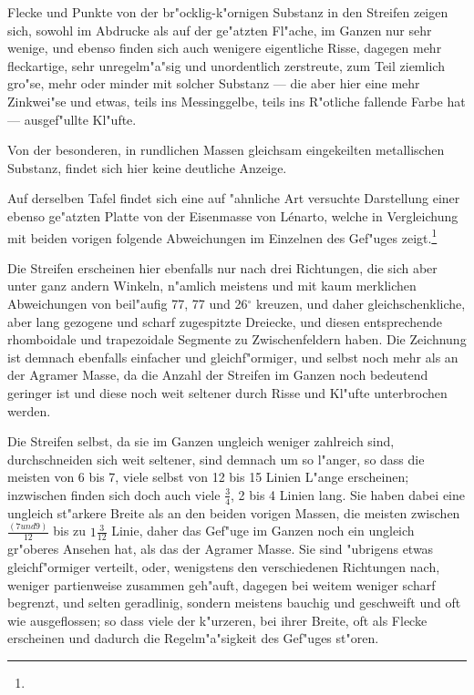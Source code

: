 \documentclass[a4paper, 11pt, oneside, german]{article}
\begin{document}
Flecke und Punkte von der br"ocklig-k"ornigen Substanz in den Streifen zeigen sich, sowohl im Abdrucke als auf der ge"atzten Fl"ache, im Ganzen nur sehr wenige, und ebenso finden sich auch wenigere eigentliche Risse, dagegen mehr fleckartige, sehr unregelm"a"sig und unordentlich zerstreute, zum Teil ziemlich gro"se, mehr oder minder mit solcher Substanz --- die aber hier eine mehr Zinkwei"se und etwas, teils ins Messinggelbe, teils ins R"otliche fallende Farbe hat --- ausgef"ullte Kl"ufte.

Von der besonderen, in rundlichen Massen gleichsam eingekeilten metallischen Substanz, findet sich hier keine deutliche Anzeige.

Auf derselben Tafel findet sich eine auf "ahnliche Art versuchte Darstellung einer ebenso ge"atzten Platte von der Eisenmasse von Lénarto, welche in Vergleichung mit beiden vorigen folgende Abweichungen im Einzelnen des Gef"uges zeigt.\footnote{}

Die Streifen erscheinen hier ebenfalls nur nach drei Richtungen, die sich aber unter ganz andern Winkeln, n"amlich meistens und mit kaum merklichen Abweichungen von beil"aufig 77, 77 und 26$^{\circ}$ kreuzen, und daher gleichschenkliche, aber lang gezogene und scharf zugespitzte Dreiecke, und diesen entsprechende rhomboidale und trapezoidale Segmente zu Zwischenfeldern haben. Die Zeichnung ist demnach ebenfalls einfacher und gleichf"ormiger, und selbst noch mehr als an der Agramer Masse, da die Anzahl der Streifen im Ganzen noch bedeutend geringer ist und diese noch weit seltener durch Risse und Kl"ufte unterbrochen werden.

Die Streifen selbst, da sie im Ganzen ungleich weniger zahlreich sind, durchschneiden sich weit seltener, sind demnach um so l"anger, so dass die meisten von 6 bis 7, viele selbst von 12 bis 15 Linien L"ange erscheinen; inzwischen finden sich doch auch viele $\frac{3}{4}$, 2 bis 4 Linien lang. Sie haben dabei eine ungleich st"arkere Breite als an den beiden vorigen Massen, die meisten zwischen $\frac{(7 und 9)}{12}$ bis zu $1\frac{3}{12}$ Linie, daher das Gef"uge im Ganzen noch ein ungleich gr"oberes Ansehen hat, als das der Agramer Masse. Sie sind "ubrigens etwas gleichf"ormiger verteilt, oder, wenigstens den verschiedenen Richtungen nach, weniger partienweise zusammen geh"auft, dagegen bei weitem weniger scharf begrenzt, und selten geradlinig, sondern meistens bauchig und geschweift und oft wie ausgeflossen; so dass viele der k"urzeren, bei ihrer Breite, oft als Flecke erscheinen und dadurch die Regelm"a"sigkeit des Gef"uges st"oren.
\end{document}
